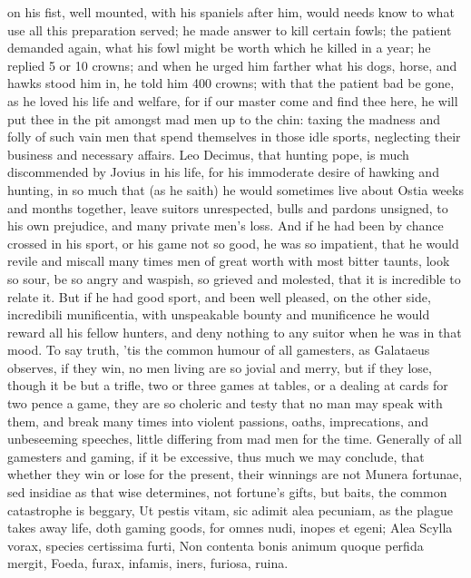 {{on his fist, well mounted, with his spaniels after him, would needs
know to what use all this preparation served; he made answer to kill
certain fowls; the patient demanded again, what his fowl might be worth
which he killed in a year; he replied 5 or 10 crowns; and when he urged
him farther what his dogs, horse, and hawks stood him in, he told him
400 crowns; with that the patient bad be gone, as he loved his life and
welfare, for if our master come and find thee here, he will put thee in
the pit amongst mad men up to the chin: taxing the madness and folly of
such vain men that spend themselves in those idle sports, neglecting
their business and necessary affairs. Leo Decimus, that hunting pope,
is much discommended by Jovius in his life, for his immoderate
desire of hawking and hunting, in so much that (as he saith) he would
sometimes live about Ostia weeks and months together, leave suitors
unrespected, bulls and pardons unsigned, to his own prejudice,
and many private men's loss. And if he had been by chance crossed
in his sport, or his game not so good, he was so impatient, that he
would revile and miscall many times men of great worth with most bitter
taunts, look so sour, be so angry and waspish, so grieved and molested,
that it is incredible to relate it. But if he had good sport, and been
well pleased, on the other side, incredibili munificentia, with
unspeakable bounty and munificence he would reward all his fellow
hunters, and deny nothing to any suitor when he was in that mood. To
say truth, 'tis the common humour of all gamesters, as Galataeus
observes, if they win, no men living are so jovial and merry, but
if they lose, though it be but a trifle, two or three games at
tables, or a dealing at cards for two pence a game, they are so
choleric and testy that no man may speak with them, and break many
times into violent passions, oaths, imprecations, and unbeseeming
speeches, little differing from mad men for the time. Generally of all
gamesters and gaming, if it be excessive, thus much we may conclude,
that whether they win or lose for the present, their winnings are not
Munera fortunae, sed insidiae as that wise \Seneca determines, not
fortune's gifts, but baits, the common catastrophe is beggary,
Ut pestis vitam, sic adimit alea pecuniam, as the plague takes
away life, doth gaming goods, for  omnes nudi, inopes et egeni;
Alea Scylla vorax, species certissima furti,
Non contenta bonis animum quoque perfida mergit,
Foeda, furax, infamis, iners, furiosa, ruina.

}}
